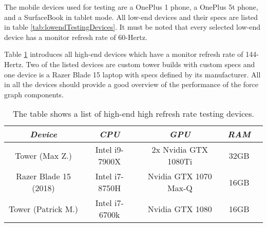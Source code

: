 The mobile devices used for testing are a OnePlus 1 phone, a OnePlus 5t phone, and a SurfaceBook in tablet mode. All low-end devices and their specs are listed in table \ref{tab:lowendTestingDevices}. It must be noted that every selected low-end device has a monitor refresh rate of 60-Hertz. 

Table \ref{tab:highendTestingDevices} introduces all high-end devices which have a monitor refresh rate of 144-Hertz. Two of the listed devices are custom tower builds with custom specs and one device is a Razer Blade 15 laptop with specs defined by its manufacturer. All in all the devices should provide a good overview of the performance of the force graph components.

\begin{table}
  \centering
  \begin{threeparttable}
    \caption{The table shows a list of high-end high refresh rate testing devices.}
    \label{tab:highendTestingDevices}
    \centering
    \def\rr{\rightskip=0pt plus1em \spaceskip=.3333em \xspaceskip=.5em\relax}
    \setlength{\tabcolsep}{1ex}
    \def\arraystretch{1.20}
    \setlength{\tabcolsep}{1ex}
    \small
    \begin{english}
      \begin{tabular}{|c||c|c|c|c|}
        \hline
          \multicolumn{1}{|c||}{\emph{Device}}&
          \multicolumn{1}{|c}{\emph{CPU}} &
          \multicolumn{1}{|c}{\emph{GPU}} &
          \multicolumn{1}{|c|}{\emph{RAM}} \\
        \hline
        \hline
        Tower (Max Z.) & 
        Intel i9-7900X & 
        2x Nvidia GTX 1080Ti & 
        32GB \\
        \hline
        Razer Blade 15 (2018) & 
        Intel i7-8750H & 
        Nvidia GTX 1070 Max-Q  & 
        16GB \\
        \hline
        Tower (Patrick M.) &
        Intel i7-6700k & 
        Nvidia GTX 1080 & 
        16GB \\
        \hline
      \end{tabular}  
    \end{english}
  \end{threeparttable}
\end{table}

